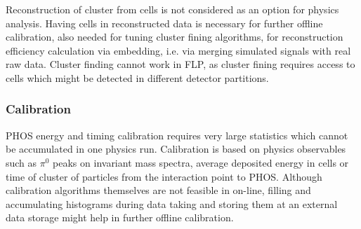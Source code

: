 Reconstruction of cluster from cells is not considered as an option
for physics analysis. Having cells in reconstructed data is necessary
for further offline calibration, also needed for tuning cluster fining
algorithms, for reconstruction efficiency calculation via embedding,
i.e. via merging simulated signals with real raw data. Cluster finding
cannot work in FLP, as cluster fining requires access to cells which
might be detected in different detector partitions.

\subsubsection{Calibration}

PHOS energy and timing calibration requires very large statistics
which cannot be accumulated in one physics run. Calibration is based
on physics observables such as $\pi^0$ peaks on invariant mass
spectra, average deposited energy in cells or time of cluster of
particles from the interaction point to PHOS. Although calibration
algorithms themselves are not feasible in on-line, filling and
accumulating histograms during data taking and storing them at an
external data storage might help in further offline calibration. 
